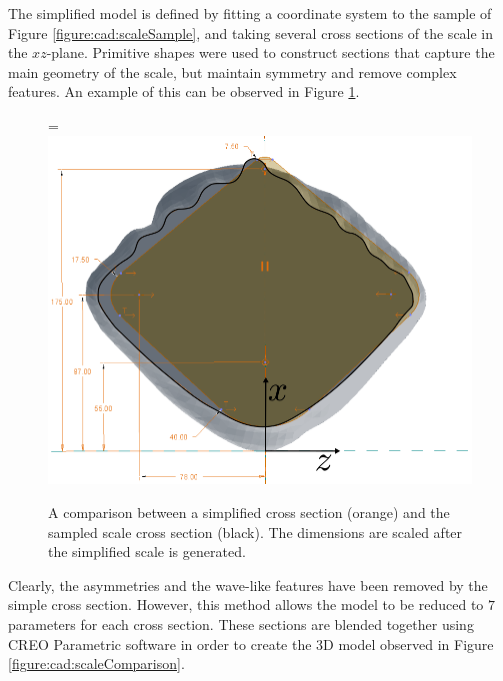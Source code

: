 \documentclass[12pt,oneside,a4paper]{article}
\newcommand*{\vcenteredhbox}[1]{\begingroup
\setbox0=\hbox{#1}\parbox{\wd0}{\box0}\endgroup}
\begin{document}
The simplified model is defined by fitting a coordinate system to the sample of Figure \ref{figure:cad:scaleSample}, and taking several cross sections of the scale in the $xz$-plane. Primitive shapes were used to construct sections that capture the main geometry of the scale, but maintain symmetry and remove complex features. An example of this can be observed in Figure \ref{figure:cad:crossSection}.
%
\begin{figure}[!t]
\centering
\vcenteredhbox{\includegraphics[width=14cm]{images/cad/crossSectionExample.png}}
\caption{A comparison between a simplified cross section (orange) and the sampled scale cross section (black). The dimensions are scaled after the simplified scale is generated.}
\label{figure:cad:crossSection}
\end{figure}
%
 Clearly, the asymmetries and the wave-like features have been removed by the simple cross section. However, this method allows the model to be reduced to $7$ parameters for each cross section. These sections are blended together using CREO Parametric software in order to create the 3D model observed in Figure \ref{figure:cad:scaleComparison}.
%
\end{document}
